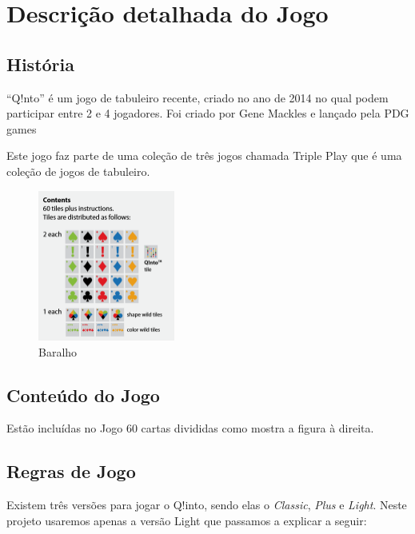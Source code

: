 \documentclass[a4paper]{article}
\begin{document}
	\newpage
	\tableofcontents
	
	\newpage
	
	\section{Descrição detalhada do Jogo}
	\subsection{História}
	
	“Q!nto” é um jogo de tabuleiro recente, criado no ano de 2014 no qual podem participar entre 2 e 4 jogadores. Foi criado por Gene Mackles e lançado pela PDG games
	
	Este jogo faz parte de uma coleção de três jogos chamada Triple Play que é uma coleção de jogos de tabuleiro.
	
	\begin{figure}
	\includegraphics[width=0.4\textwidth]{cards.png}
	\caption{\label{fig:Baralho}Baralho}
	\end{figure}
	
	\subsection{Conteúdo do Jogo}
	
	Estão incluídas no Jogo 60 cartas divididas como mostra a figura à direita.
	
	\subsection{Regras de Jogo}
	
	Existem três versões para jogar o Q!into, sendo elas o
	\textit{Classic},
	\textit{Plus} e
	\textit{Light}. Neste projeto usaremos apenas a versão Light que passamos a explicar a seguir:
	
\end{document}
